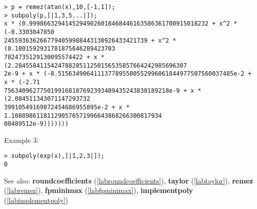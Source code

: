 \begin{center}\begin{minipage}{15cm}\begin{Verbatim}[frame=single]
> p = remez(atan(x),10,[-1,1]);
> subpoly(p,[|1,3,5...|]);
x * (0.99986632941452949026018468446163586361700915018232 + x^2 * (-0.3303047850
2455936362667794059988443130926433421739 + x^2 * (0.1801592931781875646289423703
7824735129130095574422 + x * (2.284558411542478828511250156535857664242985696307
2e-9 + x * (-8.5156349064111377895500552996061844977507560037485e-2 + x * (-2.71
7563409627750199168187692393409435243830189218e-9 + x * (2.084511343071147293732
39910549169872454686955895e-2 + x * 1.108898611811290576571996643868266300817934
00489512e-9)))))))
\end{Verbatim}
\end{minipage}\end{center}
\noindent Example 3: 
\begin{center}\begin{minipage}{15cm}\begin{Verbatim}[frame=single]
> subpoly(exp(x),[|1,2,3|]);
0
\end{Verbatim}
\end{minipage}\end{center}
See also: \textbf{roundcoefficients} (\ref{labroundcoefficients}), \textbf{taylor} (\ref{labtaylor}), \textbf{remez} (\ref{labremez}), \textbf{fpminimax} (\ref{labfpminimax}), \textbf{implementpoly} (\ref{labimplementpoly})
